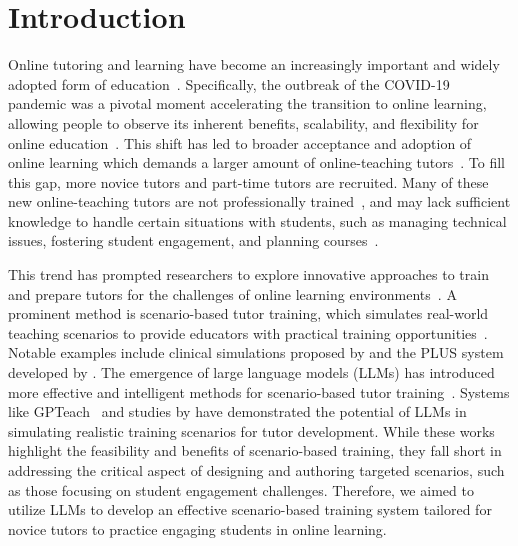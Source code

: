 \section{Introduction}
Online tutoring and learning have become an increasingly important and widely adopted form of education~\cite{paudel2021online,doi:10.3102/0034654315581420,dumford2018online,10.1145/3613904.3641985}. Specifically, the outbreak of the COVID-19 pandemic was a pivotal moment accelerating the transition to online learning, allowing people to observe its inherent benefits, scalability, and flexibility for online education~\cite{aristovnik2023impact, thomas2023so, whenthetutorbecomes}. This shift has led to broader acceptance and adoption of online learning which demands a larger amount of online-teaching tutors~\cite{barno2024scaling,whenthetutorbecomes,thomas2023so,paudel2021online}. To fill this gap, more novice tutors and part-time tutors are recruited. Many of these new online-teaching tutors are not professionally trained~\cite{thomas2023so}, and may lack sufficient knowledge to handle certain situations with students, such as managing technical issues, fostering student engagement, and planning courses~\cite{vlachopoulos2021quality}.
  
This trend has prompted researchers to explore innovative approaches to train and prepare tutors for the challenges of online learning environments~\cite{thomas2023so,rosenberg2021addressing}. A prominent method is scenario-based tutor training, which simulates real-world teaching scenarios to provide educators with practical training opportunities~\cite{developmentofscenario}. Notable examples include clinical simulations proposed by \citet{dotger2013had} and the PLUS system developed by \citet{personalizedlearning}. The emergence of large language models (LLMs) has introduced more effective and intelligent methods for scenario-based tutor training~\cite{jin2024teach,gpteach, lee23generative}. Systems like GPTeach~\cite{gpteach} and studies by \citet{lee23generative} have demonstrated the potential of LLMs in simulating realistic training scenarios for tutor development. While these works highlight the feasibility and benefits of scenario-based training, they fall short in addressing the critical aspect of designing and authoring targeted scenarios, such as those focusing on student engagement challenges. Therefore, we aimed to utilize LLMs to develop an effective scenario-based training system tailored for novice tutors to practice engaging students in online learning.

